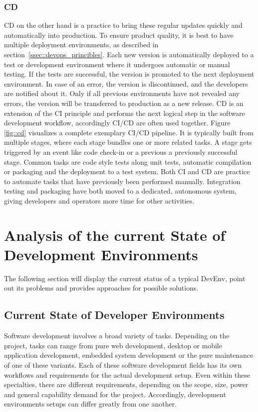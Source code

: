 \documentclass[12pt, a4paper]{article}
\begin{document}
    \subsubsection{\acl{CD}}
    \acl{CD} on the other hand is a practice to bring these regular updates quickly and automatically into production. To ensure product quality, it is best to have multiple deployment environments, as described in section~\ref{ssec::devops_princibles}. Each new version is automatically deployed to a test or development environment where it undergoes automatic or manual testing. If the tests are successful, the version is promoted to the next deployment environment. In case of an error, the version is discontinued, and the developers are notified about it. Only if all previous environments have not revealed any errors, the version will be transferred to production as a new release. CD is an extension of the CI principle and performs the next logical step in the software development workflow, accordingly \ac{CI}/\ac{CD} are often used together.\newline
    Figure \ref{fig::cd} visualizes a complete exemplary \ac{CI}/\ac{CD} pipeline. It is typically built from multiple stages, where each stage bundles one or more related tasks. A stage gets triggered by an event like code check-in or a previous a previously successful stage. Common tasks are code style tests along unit tests, automatic compilation or packaging and the deployment to a test system.\newline
    Both \ac{CI} and \ac{CD} are practice to automate tasks that have previously been performed manually. Integration testing and packaging have both moved to a dedicated, autonomous system, giving developers and operators more time for other activities.
    

\section{Analysis of the current State of Development Environments}\label{sec::problem}
The following section will display the current status of a typical \ac{DevEnv}, point out its problems and provides approaches for possible solutions.

    \subsection{Current State of Developer Environments}
    Software development involves a broad variety of tasks. Depending on the project, tasks can range from pure web development, desktop or mobile application development, embedded system development or the pure maintenance of one of these variants. Each of these software development fields has its own workflows and requirements for the actual development setup. Even within these specialties, there are different requirements, depending on the scope, size, power and general capability demand for the project. Accordingly, development environments setups can differ greatly from one another.
\end{document}
